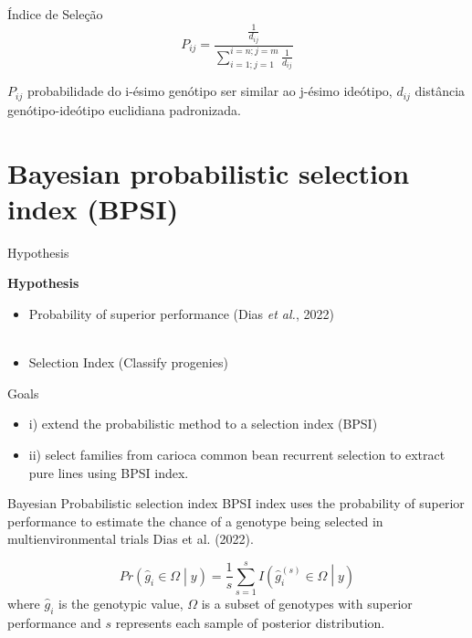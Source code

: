 \documentclass[
  ignorenonframetext,
  aspectratio=169,
]{beamer}
\begin{document}
\begin{frame}{Índice de Seleção}
\label{uxedndice-de-seleuxe7uxe3o}
\[
P_{ij} = \frac{\frac{1}{d_{ij}}}{\sum^{i=n;j=m}_{i=1;j=1} \frac{1}{d_{ij}}}
\]

\(P_{ij}\) probabilidade do i-ésimo genótipo ser similar ao j-ésimo
ideótipo, \(d_{ij}\) distância genótipo-ideótipo euclidiana padronizada.
\end{frame}

\section{Bayesian probabilistic selection index
(BPSI)}\label{bayesian-probabilistic-selection-index-bpsi}

\begin{frame}{Hypothesis}
\label{hypothesis}
\begin{block}{\textbf{Hypothesis}}
\begin{itemize}
\item Probability of superior performance (Dias \textit{et al.}, 2022)  \\~\\
\item Selection Index (Classify progenies)
\end{itemize}
\end{block}
\end{frame}

\begin{frame}{Goals}
\label{goals}
\begin{itemize}
\item i) extend the probabilistic method to a selection index (BPSI) 
\item ii) select families from carioca common bean recurrent selection to extract pure lines using BPSI index.
\end{itemize}
\end{frame}

\begin{frame}{Bayesian Probabilistic selection index}
\label{bayesian-probabilistic-selection-index}
BPSI index uses the probability of superior performance to estimate the
chance of a genotype being selected in multienvironmental trials Dias et
al. (2022).

\[
Pr\left({\hat{g}}_i \in \Omega \middle| y\right) = \frac{1}{s}\sum_{s=1}^{s} I \left({\hat{g}}_i^{(s)} \in \Omega \middle| y\right) \tag{1}
\] where \(\hat{g}_i\) is the genotypic value, \(\Omega\) is a subset of
genotypes with superior performance and \(s\) represents each sample of
posterior distribution.
\end{frame}
\end{document}
